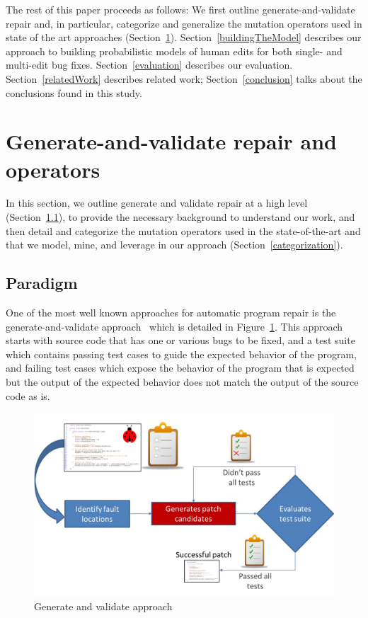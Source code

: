 \documentclass[conference]{IEEEtran}
\begin{document}
The rest of this paper proceeds as follows: We first outline
generate-and-validate repair and, in particular, 
categorize and generalize the mutation operators used in state of the art
approaches (Section~\ref{background}). Section~\ref{buildingTheModel}
describes our approach to building probabilistic models of human 
edits for both single- and multi-edit bug fixes. Section~\ref{evaluation}
describes our evaluation. Section~\ref{relatedWork} describes
related work; Section~\ref{conclusion} talks about the conclusions found in this study. 

\section{Generate-and-validate repair and operators} 
\label{background}

In this section, we outline generate and validate repair at a high level
(Section~\ref{sec-paradigm}), to provide the necessary background to understand our
work, and then detail and categorize the mutation operators used in the
state-of-the-art and that we model, mine, and leverage in our approach
(Section~\ref{categorization}).  
 
 
\subsection{Paradigm}
\label{sec-paradigm}


One of the most well known approaches for automatic program repair is the
generate-and-validate approach~\cite{legoues12} which is detailed in Figure~\ref{fig:generateandvalidate}. This approach starts with source code that
has one or various bugs to be fixed, and a test suite which contains passing
test cases to guide the expected behavior of the program, and failing test 
cases which expose the behavior of the program that is expected but the output
of the expected behavior does not match the output of the source code as is.

\begin{figure}[!h]
  \centering
    \includegraphics[scale=0.25]{Picture1}
  \caption{Generate and validate approach}
  \label{fig:generateandvalidate}
\end{figure}
\end{document}
